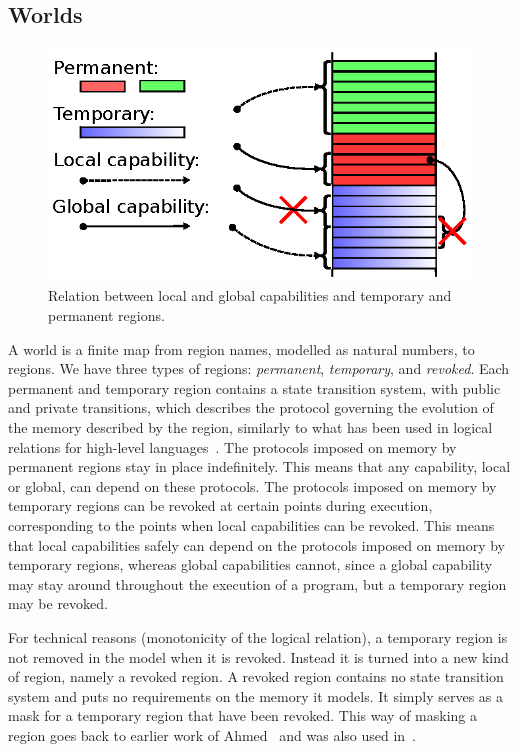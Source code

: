 \documentclass[compsoc,conference,letterpaper,fleqn]{IEEEtran}
\newcommand{\plainview}[1]{\mathrm{#1}}
\newcommand{\perma}{\plainview{perm}}
\newcommand{\temp}{\plainview{temp}}
\newcommand{\revoked}{\plainview{revoked}}
\begin{document}
\subsection{Worlds}
\begin{figure}[htbp]
  \centering
  \includegraphics{w11}
  \caption{Relation between local and global capabilities and temporary and permanent regions.}
  \label{fig:cap-world}
\end{figure}
A world is a finite map from region names, modelled as natural numbers, to regions.
We have three types of regions: \emph{permanent}, \emph{temporary}, and \emph{revoked}.
Each permanent and temporary region contains a state transition system, with
public and private transitions, which describes the protocol governing
the evolution of the memory described by the region, similarly to what
has been used in logical relations for high-level
languages~\cite{Ahmed:popl09,Dreyer:jfp12,Devriese:2016ObjCap}. 
The protocols imposed on memory by permanent regions stay in place
indefinitely. This means that any capability, local or global, can
depend on these protocols. The protocols imposed on memory by temporary
regions can be revoked at certain points during execution,
corresponding to the points when local capabilities can be
revoked. This means that local capabilities safely can depend on the
protocols imposed on memory by temporary regions, whereas global
capabilities cannot, since a global capability may stay around
throughout the execution of a program, but a temporary region may be
revoked.

For technical reasons (monotonicity of the logical relation), a
temporary region is not removed in the model when it is
revoked. Instead it is turned into a new kind of region, namely a
revoked region. A revoked region contains no state transition
system and puts no requirements on the memory it models. It
simply serves as a mask for a temporary region that have been revoked.
This way of masking a region goes back to earlier work of
Ahmed~\cite{Ahmed2004semantics} and was also used in~\cite{Thamsborg:2011:KLR:2034773.2034831}.
\end{document}
